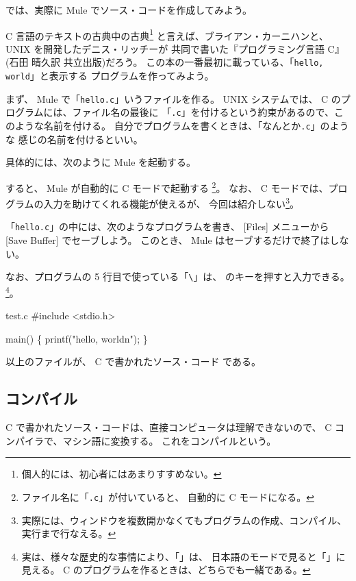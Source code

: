 では、実際に Mule でソース・コードを作成してみよう。

 C 言語のテキストの古典中の古典\footnote{個人的には、初心者にはあまりすすめない。}
と言えば、ブライアン・カーニハンと、 UNIX を開発したデニス・リッチーが
共同で書いた『プログラミング言語 C』(石田 晴久訳 共立出版)だろう。
この本の一番最初に載っている、「\texttt{hello, world}」と表示する
プログラムを作ってみよう。

まず、 Mule で「\texttt{hello.c}」いうファイルを作る。
 UNIX システムでは、 C のプログラムには、ファイル名の最後に
「\texttt{.c}」を付けるという約束があるので、このような名前を付ける。
自分でプログラムを書くときは、「なんとか\texttt{.c}」のような
感じの名前を付けるといい。

具体的には、次のように Mule を起動する。

\begin{progls}
\end{progls}

すると、 Mule が自動的に C モードで起動する
\footnote{ファイル名に「\texttt{.c}」が付いていると、
自動的に C モードになる。}。
なお、 C モードでは、プログラムの入力を助けてくれる機能が使えるが、
今回は紹介しない\footnote{実際には、ウィンドウを複数開かなくてもプログラムの作成、コンパイル、実行まで行なえる。}。

\bigskip

「\texttt{hello.c}」の中には、次のようなプログラムを書き、
 [Files] メニューから [Save Buffer] でセーブしよう。
このとき、 Mule はセーブするだけで終了はしない。

なお、プログラムの 5 行目で使っている「\verb+\+」は、
 \KEYTOP{\yen} のキーを押すと入力できる。
\footnote{実は、様々な歴史的な事情により、「\texttt{\bcsl}」は、
日本語のモードで見ると「\texttt{\yen}」に見える。
 C のプログラムを作るときは、どちらでも一緒である。}。

\begin{progls2}{test.c}
#include <stdio.h>

main()
\{
  printf("hello, world{\bcsl}n");
\}
\end{progls2}

以上のファイルが、 C で書かれたソース・コード
である。

\newpage

\subsection{コンパイル}

 C で書かれたソース・コードは、直接コンピュータは理解できないので、
 C コンパイラで、マシン語に変換する。
これをコンパイルという。

